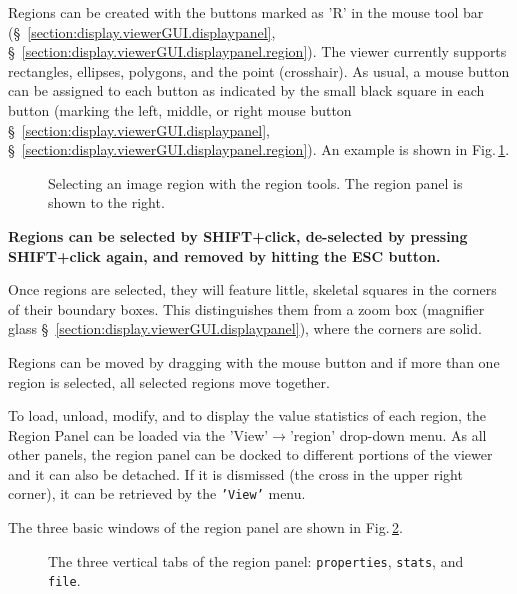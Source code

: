   Regions can be created with the buttons marked as 'R' in the mouse
  tool bar (\S~\ref{section:display.viewerGUI.displaypanel},
  \S~\ref{section:display.viewerGUI.displaypanel.region}). The viewer
  currently supports rectangles, ellipses, polygons, and the point
  (crosshair). As usual, a mouse button can be assigned to each button
  as indicated by the small black square in each button (marking the
  left, middle, or right mouse button
  \S~\ref{section:display.viewerGUI.displaypanel},
  \S~\ref{section:display.viewerGUI.displaypanel.region}). An example
  is shown in Fig.\,\ref{fig:viewer_regions}.


\begin{figure}[h!]
\begin{center}
\caption{\label{fig:viewer_regions} Selecting an image region with the
region tools. The region panel is shown to the right.}
\hrulefill
\end{center}
\end{figure}

{\bf Regions can be selected by SHIFT+click, de-selected by pressing
  SHIFT+click again, and removed by hitting the ESC button. }


Once regions are selected, they will feature little, skeletal squares
in the corners of their boundary boxes. This distinguishes them from a
zoom box (magnifier
glass \S~\ref{section:display.viewerGUI.displaypanel}), where the
corners are solid. 

Regions can be moved by dragging with the mouse button and if more
than one region is selected, all selected regions move together.

To load, unload, modify, and to display the value statistics of each
region, the Region Panel can be loaded via the
'View'$\rightarrow$'region' drop-down menu. As all other panels, the
region panel can be docked to different portions of the viewer and it
can also be detached. If it is dismissed (the cross in the upper right
corner), it can be retrieved by the {\tt 'View'} menu. 

The three basic windows of the region panel are shown in
Fig.\,\ref{fig:viewer_regionpanel}.

\begin{figure}[h!]
\begin{center}
\caption{\label{fig:viewer_regionpanel} The three vertical tabs of the
region panel: {\tt properties}, {\tt stats}, and {\tt file}.}
\hrulefill
\end{center}
\end{figure}


